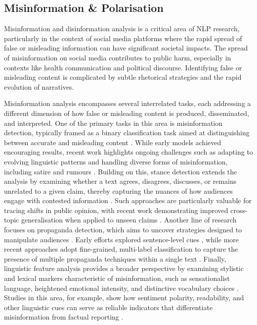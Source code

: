 \subsection{Misinformation \& Polarisation}

Misinformation and disinformation analysis is a critical area of \ac{NLP} research, particularly in the context of social media platforms where the rapid spread of false or misleading information can have significant societal impacts. The spread of misinformation on social media contributes to public harm, especially in contexts like health communication and political discourse. Identifying false or misleading content is complicated by subtle rhetorical strategies and the rapid evolution of narratives.


Misinformation analysis encompasses several interrelated tasks, each addressing a different dimension of how false or misleading content is produced, disseminated, and interpreted. One of the primary tasks in this area is misinformation detection, typically framed as a binary classification task aimed at distinguishing between accurate and misleading content \cite{oshikawa-etal-2020-survey, aljawarneh2022fake}. While early models achieved encouraging results, recent work highlights ongoing challenges such as adapting to evolving linguistic patterns and handling diverse forms of misinformation, including satire and rumours \cite{taylor2024misinformation}. Building on this, stance detection extends the analysis by examining whether a text agrees, disagrees, discusses, or remains unrelated to a given claim, thereby capturing the nuances of how audiences engage with contested information \cite{hardalov2022survey, karande2021stance}. Such approaches are particularly valuable for tracing shifts in public opinion, with recent work demonstrating improved cross-topic generalisation when applied to unseen claims \cite{aljrees2023fake}. Another line of research focuses on propaganda detection, which aims to uncover strategies designed to manipulate audiences \cite{da2020survey, faye-etal-2024-exposing}. Early efforts explored sentence-level cues \cite{cruz2019sentence}, while more recent approaches adopt fine-grained, multi-label classification to capture the presence of multiple propaganda techniques within a single text \cite{ahmad2025enhanced}. Finally, linguistic feature analysis provides a broader perspective by examining stylistic and lexical markers characteristic of misinformation, such as sensationalist language, heightened emotional intensity, and distinctive vocabulary choices \cite{chang2025sens}. Studies in this area, for example, show how sentiment polarity, readability, and other linguistic cues can serve as reliable indicators that differentiate misinformation from factual reporting \cite{choudhary2021linguistic}.

